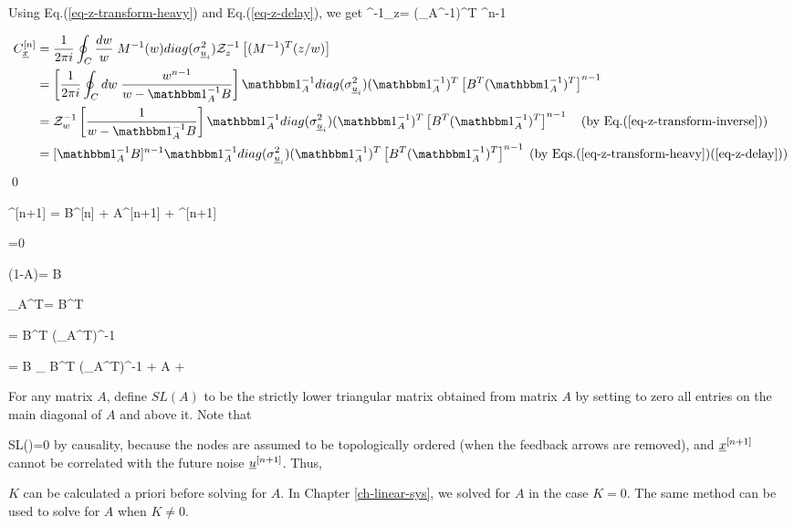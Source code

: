 Using Eq.(\ref{eq-z-transform-heavy})
and Eq.(\ref{eq-z-delay}), we get
\beq
\calz^{-1}_z
=
 (\indi_A^{-1})^T
^{n-1}
\eeq

\begin{align}
C_\rvx^{[n]}
&=
\frac{1}{2\pi i}
\oint_C \frac{dw}{w}\;
M^{-1}(w)
diag(\s^2_{\rvu_i})
\calz^{-1}_z\left[
(M^{-1})^T(z/w)\right]
\\
&=
\left[
\frac{1}{2\pi i}
\oint_C dw\;
\frac{w^{n-1}}
{w-\indi_A^{-1}B}
\right]
\indi_A^{-1}
diag(\s^2_{\rvu_i})
 (\indi_A^{-1})^T
\left[B^T(\indi_A^{-1})^T\right]^{n-1}
\\
&=
\calz_{w}^{-1}
\left[
\frac{1}
{w-\indi_A^{-1}B}
\right]
\indi_A^{-1}
diag(\s^2_{\rvu_i})
 (\indi_A^{-1})^T
\left[B^T(\indi_A^{-1})^T\right]^{n-1}
\quad\text{(by Eq.(\ref{eq-z-transform-inverse}))}
\\
&=
[\indi_A^{-1}B]^{n-1}
\indi_A^{-1}
diag(\s^2_{\rvu_i})
 (\indi_A^{-1})^T
\left[B^T(\indi_A^{-1})^T\right]^{n-1}
\;\text{(by Eqs.(\ref{eq-z-transform-heavy})(\ref{eq-z-delay}))}
\end{align}
\qed

\beq
\rvx^{[n+1]} = B\rvx^{[n]} + A\rvx^{[n+1]}
+ \rvu^{[n+1]}
\eeq

\beq
{}=0
\eeq

\beq
(1-A)=
B 
\eeq

\beq
{}
\eeq

\beq
{}\indi_A^T=
B^T
\eeq

\beq
{}=
B^T
(\indi_A^T)^{-1}
\eeq

\beq
{}
= B
_
{B^T
(\indi_A^T)^{-1}} + A
+ 
\eeq

For any matrix $A$,
define $SL(A)$ 
to be the strictly lower triangular
matrix obtained from matrix $A$ by
setting to zero all entries 
on the main diagonal of $A$ and above it.
Note that

\beq 
SL()=0
\eeq
by causality,
because the nodes are assumed to be topologically ordered (when the feedback
arrows are removed),
and ${\underline{x}}^{[n+1]}$ cannot be correlated
with the future noise ${\underline{u}}^{[n+1]}$.
Thus,

\beq
{}
\eeq
$K$ can be calculated a priori   before
solving for $A$. In  Chapter \ref{ch-linear-sys}, we solved for 
$A$ in the case $K=0$.
The same method can be used to solve for
$A$ when $K\neq 0$.